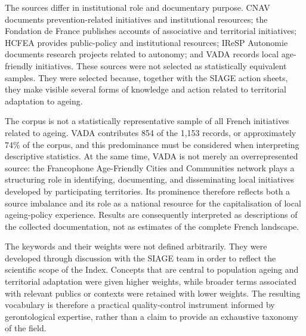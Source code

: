 The sources differ in institutional role and documentary purpose. CNAV documents
prevention-related initiatives and institutional resources; the Fondation de France
publishes accounts of associative and territorial initiatives; HCFEA provides
public-policy and institutional resources; IReSP Autonomie documents research
projects related to autonomy; and VADA records local age-friendly initiatives.
These sources were not selected as statistically equivalent samples. They were
selected because, together with the SIAGE action sheets, they make visible several
forms of knowledge and action related to territorial adaptation to ageing.


The corpus is not a statistically representative sample of all French initiatives
related to ageing. VADA contributes 854 of the 1,153 records, or approximately
74\% of the corpus, and this predominance must be considered when interpreting
descriptive statistics. At the same time, VADA is not merely an overrepresented
source: the Francophone Age-Friendly Cities and Communities network plays a
structuring role in identifying, documenting, and disseminating local initiatives
developed by participating territories. Its prominence therefore reflects both a
source imbalance and its role as a national resource for the capitalisation of local
ageing-policy experience. Results are consequently interpreted as descriptions of
the collected documentation, not as estimates of the complete French landscape.


The keywords and their weights were not defined arbitrarily. They were developed
through discussion with the SIAGE team in order to reflect the scientific scope of
the Index. Concepts that are central to population ageing and territorial adaptation
were given higher weights, while broader terms associated with relevant publics or
contexts were retained with lower weights. The resulting vocabulary is therefore a
practical quality-control instrument informed by gerontological expertise, rather
than a claim to provide an exhaustive taxonomy of the field.

